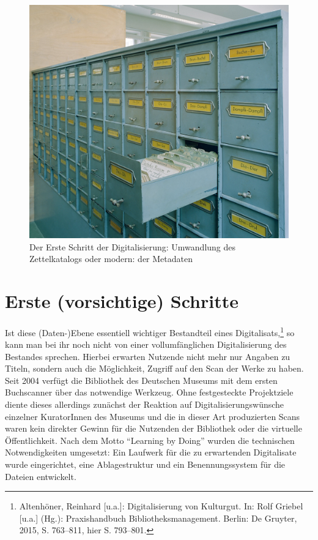 \documentclass[a4paper,
fontsize=11pt,
oneside,
numbers=noperiodatend,
parskip=half-,
bibliography=totoc,
final
]{scrartcl}
\begin{document}
\begin{figure}
\centering
\includegraphics[width=.70\textwidth]{img/Abb2.jpg}
\caption{Der Erste Schritt der Digitalisierung: Umwandlung des
Zettelkatalogs oder modern: der Metadaten}
\end{figure}

\hypertarget{erste-vorsichtige-schritte}{%
\section{Erste (vorsichtige)
Schritte}\label{erste-vorsichtige-schritte}}

Ist diese (Daten-)Ebene essentiell wichtiger Bestandteil eines
Digitalisats,\footnote{Altenhöner, Reinhard {[}u.a.{]}: Digitalisierung
  von Kulturgut. In: Rolf Griebel {[}u.a.{]} (Hg.): Praxishandbuch
  Bibliotheksmanagement. Berlin: De Gruyter, 2015, S. 763--811, hier S.
  793--801.} so kann man bei ihr noch nicht von einer vollumfänglichen
Digitalisierung des Bestandes sprechen. Hierbei erwarten Nutzende nicht
mehr nur Angaben zu Titeln, sondern auch die Möglichkeit, Zugriff auf
den Scan der Werke zu haben. Seit 2004 verfügt die Bibliothek des
Deutschen Museums mit dem ersten Buchscanner über das notwendige
Werkzeug. Ohne festgesteckte Projektziele diente dieses allerdings
zunächst der Reaktion auf Digitalisierungswünsche einzelner KuratorInnen
des Museums und die in dieser Art produzierten Scans waren kein direkter
Gewinn für die Nutzenden der Bibliothek oder die virtuelle
Öffentlichkeit. Nach dem Motto \enquote{Learning by Doing} wurden die
technischen Notwendigkeiten umgesetzt: Ein Laufwerk für die zu
erwartenden Digitalisate wurde eingerichtet, eine Ablagestruktur und ein
Benennungssystem für die Dateien entwickelt.
\end{document}

